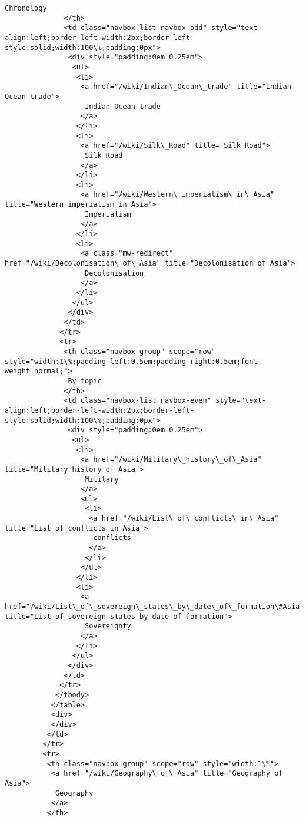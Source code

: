 \documentclass[11pt]{article}
\begin{document}
\begin{Verbatim}[commandchars=\\\{\}]
               Chronology
              </th>
              <td class="navbox-list navbox-odd" style="text-align:left;border-left-width:2px;border-left-style:solid;width:100\%;padding:0px">
               <div style="padding:0em 0.25em">
                <ul>
                 <li>
                  <a href="/wiki/Indian\_Ocean\_trade" title="Indian Ocean trade">
                   Indian Ocean trade
                  </a>
                 </li>
                 <li>
                  <a href="/wiki/Silk\_Road" title="Silk Road">
                   Silk Road
                  </a>
                 </li>
                 <li>
                  <a href="/wiki/Western\_imperialism\_in\_Asia" title="Western imperialism in Asia">
                   Imperialism
                  </a>
                 </li>
                 <li>
                  <a class="mw-redirect" href="/wiki/Decolonisation\_of\_Asia" title="Decolonisation of Asia">
                   Decolonisation
                  </a>
                 </li>
                </ul>
               </div>
              </td>
             </tr>
             <tr>
              <th class="navbox-group" scope="row" style="width:1\%;padding-left:0.5em;padding-right:0.5em;font-weight:normal;">
               By topic
              </th>
              <td class="navbox-list navbox-even" style="text-align:left;border-left-width:2px;border-left-style:solid;width:100\%;padding:0px">
               <div style="padding:0em 0.25em">
                <ul>
                 <li>
                  <a href="/wiki/Military\_history\_of\_Asia" title="Military history of Asia">
                   Military
                  </a>
                  <ul>
                   <li>
                    <a href="/wiki/List\_of\_conflicts\_in\_Asia" title="List of conflicts in Asia">
                     conflicts
                    </a>
                   </li>
                  </ul>
                 </li>
                 <li>
                  <a href="/wiki/List\_of\_sovereign\_states\_by\_date\_of\_formation\#Asia" title="List of sovereign states by date of formation">
                   Sovereignty
                  </a>
                 </li>
                </ul>
               </div>
              </td>
             </tr>
            </tbody>
           </table>
           <div>
           </div>
          </td>
         </tr>
         <tr>
          <th class="navbox-group" scope="row" style="width:1\%">
           <a href="/wiki/Geography\_of\_Asia" title="Geography of Asia">
            Geography
           </a>
          </th>

\end{Verbatim}
\end{document}
